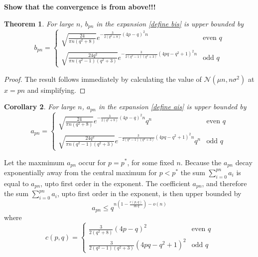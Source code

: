 \documentclass[a4paper,12pt]{article}
\newtheorem{theorem}{Theorem}
\newtheorem{corollary}[theorem]{Corollary}
\begin{document}
\textbf{Show that the convergence is from above!!!}

\begin{theorem}
    For large $n$, $b_{pn}$ in the expansion \cref{define bis} is upper bounded by
    \begin{equation}
        b_{pn} = \begin{cases}\sqrt{\frac{24}{\pi n (q^2 + 8)}} e^{-\frac{3}{2(q^2 + 8)}(4p - q)^2 n} & \text{even $q$}\\
        \sqrt{\frac{24q^2}{\pi n (q^2 - 1)(q^2 + 3)}} e^{-\frac{3}{2(q^2 - 1)(q^2 + 3)}(4pq - q^2 + 1)^2 n} & \text{odd $q$}
        \end{cases}
    \end{equation}
\end{theorem}
\begin{proof}
    The result follows immediately by calculating the value of $\mathcal{N}(\mu n, n \sigma^2)$ at $x = pn$ and simplifying.
\end{proof}

\begin{corollary}
    For large $n$, $a_{pn}$ in the expansion \ref{define ais} is upper bounded by 
    \begin{equation}
        a_{pn} = \begin{cases}\sqrt{\frac{24}{\pi n (q^2 + 8)}} e^{-\frac{3}{2(q^2 + 8)}(4p - q)^2 n} q^n & \text{even $q$}\\
        \sqrt{\frac{24q^2}{\pi n (q^2 - 1)(q^2 + 3)}} e^{-\frac{3}{2(q^2 - 1)(q^2 + 3)}(4pq - q^2 + 1)^2 n} q^n & \text{odd $q$}
        \end{cases}
    \end{equation}
\end{corollary}

Let the maxmimum $a_{pn}$ occur for $p = p^*$, for some fixed $n$. Because the $a_{pn}$ decay exponentially away from the central maximum for $p < p^*$ the sum $\sum_{i = 0}^{pn}a_i$ is equal to $a_{pn}$, upto first order in the exponent. The coefficient $a_{pn}$, and therefore the sum $\sum_{i = 0}^{pn}a_i$, upto first order in the exponent, is then upper bounded by
$$
    a_{pn} \leq q^{n\left(1- \frac{c(p,q)}{\ln q}\right) - o(n)}
$$ 
where
\begin{equation}
    c(p,q) = \begin{cases} {\frac{3}{2(q^2 + 8)}(4p - q)^2} & \text{even $q$}\\
    {\frac{3}{2(q^2 - 1)(q^2 + 3)}(4pq - q^2 + 1)^2} & \text{odd $q$}
    \end{cases}
\end{equation}
\end{document}
